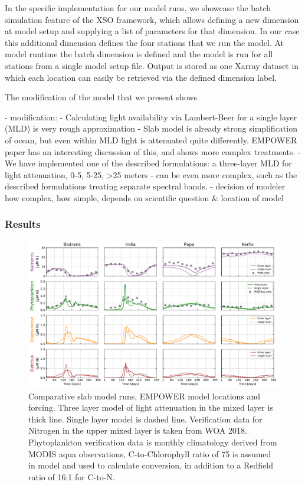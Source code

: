 \documentclass[journal abbreviation, manuscript]{copernicus}
\begin{document}
In the specific implementation for our model runs, we showcase the batch simulation feature of the XSO framework, which allows defining a new dimension at model setup and supplying a list of parameters for that dimension. In our case this additional dimension defines the four stations that we run the model. At model runtime the batch dimension is defined and the model is run for all stations from a single model setup file. Output is stored as one Xarray dataset in which each location can easily be retrieved via the defined dimension label.

The modification of the model that we present shows 

- modification:
- Calculating light availability via Lambert-Beer for a single layer (MLD) is very rough approximation
- Slab model is already strong simplification of ocean, but even within MLD light is attenuated quite differently. EMPOWER paper has an interesting discussion of this, and shows more complex treatments.
- We have implemented one of the described formulations: a three-layer MLD for light attenuation, 0-5, 5-25, >25 meters
- can be even more complex, such as the described formulations treating separate spectral bands.
- decision of modeler how complex, how simple, depends on scientific question \& location of model




\subsubsection{Results}
\begin{figure}[t]
\includegraphics[width=15cm]{Figures/firstdraft_plots/02_EMPOWER_lightcomp.pdf}
\caption{Comparative slab model runs, EMPOWER model locations and forcing. Three layer model of light attenuation in the mixed layer is thick line. Single layer model is dashed line. Verification data for Nitrogen in the upper mixed layer is taken from WOA 2018. Phytoplankton verification data is monthly climatology derived from MODIS aqua observations, C-to-Chlorophyll ratio of 75 is assumed in model and used to calculate conversion, in addition to a Redfield ratio of 16:1 for C-to-N.}
\label{Figure:ResultsEMPOWER}
\end{figure}
\end{document}
